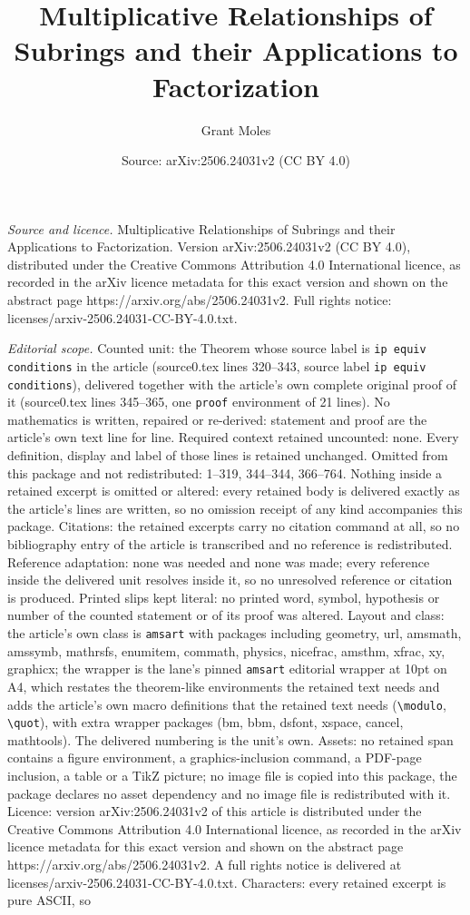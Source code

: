 \documentclass[10pt,a4paper]{amsart}
\title[Multiplicative Relationships of Subrings and their Applicati]{Multiplicative Relationships of Subrings and their Applications to Factorization}
\author{Grant Moles}
\date{Source: arXiv:2506.24031v2 (CC BY 4.0)}
\begin{document}
\maketitle

\noindent\emph{Source and licence.} Multiplicative Relationships of Subrings and their Applications to Factorization. Version arXiv:2506.24031v2 (CC BY 4.0), distributed under the Creative Commons Attribution 4.0 International licence, as recorded in the arXiv licence metadata for this exact version and shown on the abstract page https://arxiv.org/abs/2506.24031v2. Full rights notice: licenses/arxiv-2506.24031-CC-BY-4.0.txt.\par\smallskip

\noindent\textit{Editorial scope.} Counted unit: the Theorem whose source label is \texttt{ip equiv conditions} in the article (source0.tex lines 320--343, source label \texttt{ip equiv conditions}), delivered together with the article's own complete original proof of it (source0.tex lines 345--365, one \texttt{proof} environment of 21 lines). No mathematics is written, repaired or re-derived: statement and proof are the article's own text line for line. Required context retained uncounted: none. Every definition, display and label of those lines is retained unchanged. Omitted from this package and not redistributed: 1--319, 344--344, 366--764. Nothing inside a retained excerpt is omitted or altered: every retained body is delivered exactly as the article's lines are written, so no omission receipt of any kind accompanies this package. Citations: the retained excerpts carry no citation command at all, so no bibliography entry of the article is transcribed and no reference is redistributed. Reference adaptation: none was needed and none was made; every reference inside the delivered unit resolves inside it, so no unresolved reference or citation is produced. Printed slips kept literal: no printed word, symbol, hypothesis or number of the counted statement or of its proof was altered. Layout and class: the article's own class is \texttt{amsart} with packages including geometry, url, amsmath, amssymb, mathrsfs, enumitem, commath, physics, nicefrac, amsthm, xfrac, xy, graphicx; the wrapper is the lane's pinned \texttt{amsart} editorial wrapper at 10pt on A4, which restates the theorem-like environments the retained text needs and adds the article's own macro definitions that the retained text needs (\texttt{\textbackslash modulo}, \texttt{\textbackslash quot}), with extra wrapper packages (bm, bbm, dsfont, xspace, cancel, mathtools). The delivered numbering is the unit's own. Assets: no retained span contains a figure environment, a graphics-inclusion command, a PDF-page inclusion, a table or a TikZ picture; no image file is copied into this package, the package declares no asset dependency and no image file is redistributed with it. Licence: version arXiv:2506.24031v2 of this article is distributed under the Creative Commons Attribution 4.0 International licence, as recorded in the arXiv licence metadata for this exact version and shown on the abstract page https://arxiv.org/abs/2506.24031v2. A full rights notice is delivered at licenses/arxiv-2506.24031-CC-BY-4.0.txt. Characters: every retained excerpt is pure ASCII, so 
\end{document}
